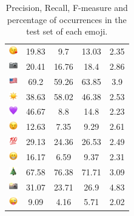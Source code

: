 \documentclass{article}
\begin{document}
\begin{table}
\begin{tabular}{|c|ccc|c|}
\includegraphics[height=0.37cm,width=0.37cm]{img/face_blowing_a_kiss.png} & 19.83 & 9.7 & 13.03 & 2.35\\ 
\includegraphics[height=0.37cm,width=0.37cm]{img/camera.png} & 20.41 & 16.76 & 18.4 & 2.86\\ 
\includegraphics[height=0.37cm,width=0.37cm]{img/United_States.png} & 69.2 & 59.26 & 63.85 & 3.9\\ 
\includegraphics[height=0.37cm,width=0.37cm]{img/sun.png} & 38.63 & 58.02 & 46.38 & 2.53\\ 
\includegraphics[height=0.37cm,width=0.37cm]{img/purple_heart.png} & 46.67 & 8.8 & 14.8 & 2.23\\ 
\includegraphics[height=0.37cm,width=0.37cm]{img/winking_face.png} & 12.63 & 7.35 & 9.29 & 2.61\\ 
\includegraphics[height=0.37cm,width=0.37cm]{img/hundred_points.png} & 29.13 & 24.36 & 26.53 & 2.49\\ 
\includegraphics[height=0.37cm,width=0.37cm]{img/beaming_face_with_smiling_eyes.png} & 16.17 & 6.59 & 9.37 & 2.31\\ 
\includegraphics[height=0.37cm,width=0.37cm]{img/Christmas_tree.png} & 67.58 & 76.38 & 71.71 & 3.09\\ 
\includegraphics[height=0.37cm,width=0.37cm]{img/camera_with_flash.png} & 31.07 & 23.71 & 26.9 & 4.83\\ 
\includegraphics[height=0.37cm,width=0.37cm]{img/winking_face_with_tongue.png} & 9.09 & 4.16 & 5.71 & 2.02\\ 

\hline
\end{tabular}
\caption{\label{table:emoji_detailed} Precision, Recall, F-measure and percentage of occurrences in the test set of each emoji.}
\end{table}
\end{document}

